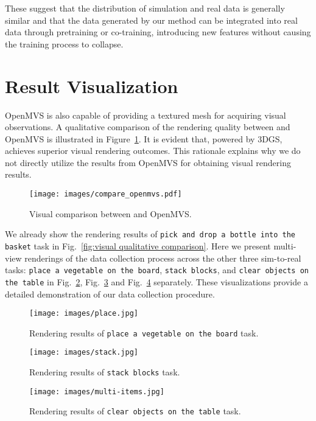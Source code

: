 These suggest that the distribution of simulation and real data is generally similar and that the data generated by our method can be integrated into real data through pretraining or co-training, introducing new features without causing the training process to collapse.


\section{Result Visualization}
\label{sec: visualization}

OpenMVS is also capable of providing a textured mesh for acquiring visual observations. A qualitative comparison of the rendering quality between \our and OpenMVS is illustrated in Figure~\ref{fig:compare_openmvs}. It is evident that, powered by 3DGS, \our achieves superior visual rendering outcomes. This rationale explains why we do not directly utilize the results from OpenMVS for obtaining visual rendering results.

\begin{figure}[!htbp]
    \centering
    \texttt{[image: images/compare\_openmvs.pdf]}
    \caption{Visual comparison between \our and OpenMVS.}
    \label{fig:compare_openmvs}
\end{figure}

We already show the rendering results of \texttt{pick and drop a bottle into the basket} task in Fig.~\ref{fig:visual qualitative comparison}. Here we present multi-view renderings of the data collection process across the other three sim-to-real tasks: \texttt{place a vegetable on the board}, \texttt{stack blocks}, and \texttt{clear objects on the table} in Fig.~\ref{fig:more-vis-place}, Fig.~\ref{fig:more-vis-stack} and Fig.~\ref{fig:more-vis-clear} separately. These visualizations provide a detailed demonstration of our data collection procedure.

\begin{figure}[!htbp]
    \centering
    \texttt{[image: images/place.jpg]}
    \caption{Rendering results of \texttt{place a vegetable on the board} task.}
    \label{fig:more-vis-place}
\end{figure}

\begin{figure}[!htbp]
    \centering
    \texttt{[image: images/stack.jpg]}
    \caption{Rendering results of \texttt{stack blocks} task.}
    \label{fig:more-vis-stack}
\end{figure}

\begin{figure}[!htbp]
    \centering
    \texttt{[image: images/multi-items.jpg]}
    \caption{Rendering results of \texttt{clear objects on the table} task.}
    \label{fig:more-vis-clear}
\end{figure}
